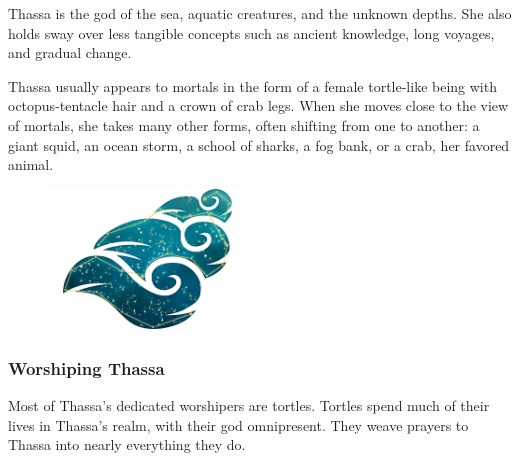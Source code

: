     Thassa is the god of the sea, aquatic creatures, and the unknown depths.
    She also holds sway over less tangible concepts such as ancient knowledge, long voyages, and gradual change.


    Thassa usually appears to mortals in the form of a female tortle-like being with octopus-tentacle hair and a crown of crab legs.
    When she moves close to the view of mortals, she takes many other forms, often shifting from one to another: a giant squid, an ocean storm, a school of sharks, a fog bank, or a crab, her favored animal.

    \begin{figure}[b]
        \centering
        \includegraphics[width=0.47\textwidth]{02viphoger/img/10s_thassa.png}
    \end{figure}

    \subsubsection{Worshiping Thassa}
        Most of Thassa's dedicated worshipers are tortles.%
        Tortles spend much of their lives in Thassa's realm, with their god omnipresent.
        They weave prayers to Thassa into nearly everything they do.

        \pagebreak~
        \vspace{15.5cm}

